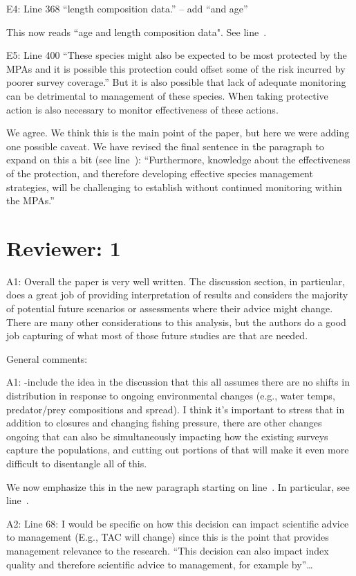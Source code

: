 \documentclass[12pt]{article}
\newcommand{\rev}[1]{{\color{niceblue} #1}}
\newcommand{\lr}[1]{line~\lineref{#1}}
\begin{document}
\rev{E4: Line 368 “length composition data.” – add “and age”}

This now reads ``age and length composition data". See \lr{E4}.

\rev{E5: Line 400 “These species might also be expected to be most protected by the MPAs and it is possible this protection could offset some of the risk incurred by poorer survey coverage.” But it is also possible that lack of adequate monitoring can be detrimental to management of these species. When taking protective action is also necessary to monitor effectiveness of these actions.}

We agree. We think this is the main point of the paper, but here we were adding one possible caveat. We have revised the final sentence in the paragraph to expand on this a bit (see \lr{E5}): ``Furthermore, knowledge about the effectiveness of the protection, and therefore developing effective species management strategies, will be challenging to establish without continued monitoring within the MPAs.''

\section{Reviewer: 1}

\rev{A1: Overall the paper is very well written. The discussion section, in particular, does a great job of providing interpretation of results and considers the majority of potential future scenarios or assessments where their advice might change. There are many other considerations to this analysis, but the authors do a good job capturing of what most of those future studies are that are needed.}

\rev{General comments:}

\rev{A1: -include the idea in the discussion that this all assumes there are no shifts in distribution in response to ongoing environmental changes (e.g., water temps, predator/prey compositions and spread). I think it’s important to stress that in addition to closures and changing fishing pressure, there are other changes ongoing that can also be simultaneously impacting how the existing surveys capture the populations, and cutting out portions of that will make it even more difficult to disentangle all of this.}

We now emphasize this in the new paragraph starting on \lr{E1}. In particular, see \lr{A1}.

\rev{A2: Line 68: I would be specific on how this decision can impact scientific advice to management (E.g., TAC will change) since this is the point that provides management relevance to the research. “This decision can also impact index quality and therefore scientific advice to management, for example by”…}
\end{document}
